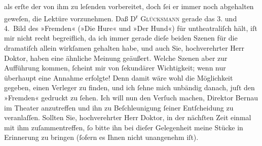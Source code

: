 \begin{ledgroupsized}[t]{13cm}
                    als erſte der von ihm zu leſenden vorbereitet, doch ſei er immer noch abgehalten
                    geweſen, die Lektüre vorzunehmen.\pend
           \pstart
           Daß D\textsuperscript{r}{ }\textsc{Glücksmann} gerade das 3. und 4. Bild des »Fremden«
                        (»Die Hure« und »Der Hund«) für
                    untheatraliſch hält, iſt mir nicht recht begreiflich, da ich immer gerade dieſe
                    beiden Szenen für die dramatiſch allein wirkſamen gehalten habe, und auch Sie,
                    hochverehrter Herr Doktor, haben eine ähnliche Meinung geäußert.\pend
           \pstart
           Welche Szenen aber zur Aufführung kommen, ſcheint mir von ſekundärer Wichtigkeit;
                    wenn nur überhaupt eine Annahme erfolgte! Denn damit wäre wohl die Möglichkeit
                    gegeben, einen Verleger zu finden, und ich ſehne mich unbändig danach, juſt den
                        »Fremden« gedruckt zu ſehen.\pend
           \pstart
           Ich will nun den Verſuch machen, Direktor Bernau im Theater anzu{\pb}treffen und ihn zu Beſchleunigung ſeiner Entſcheidung zu veranlaſſen. Sollten
                    Sie, hochverehrter Herr Doktor, in der nächſten Zeit einmal mit ihm
                    zuſammentreffen, ſo bitte ihn bei dieſer Gelegenheit meine Stücke in Erinnerung
                    zu bringen (ſofern es Ihnen nicht unangenehm iſt).\pend
           \pstart

\end{ledgroupsized}
